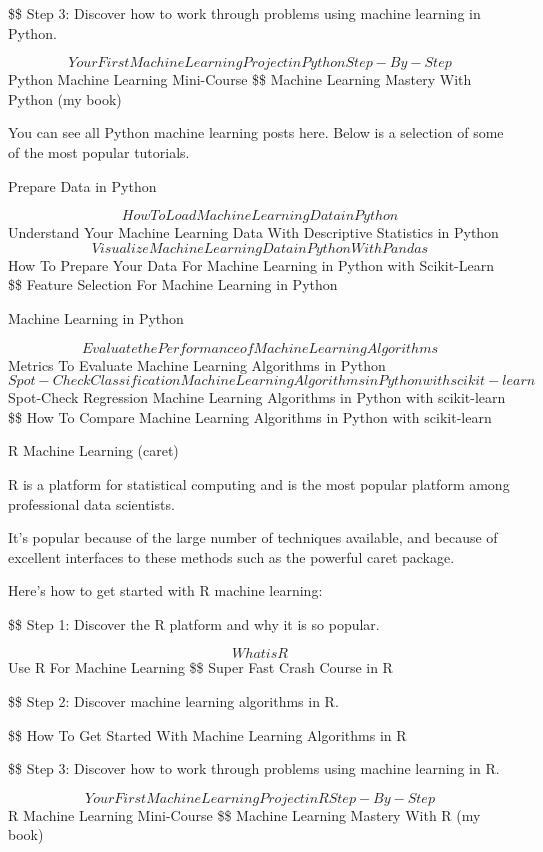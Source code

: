 \documentclass[11pt]{article}
\begin{document}
\$\$ Step 3: Discover how to work through problems using machine learning in Python. 

$$ Your First Machine Learning Project in Python Step-By-Step
 $$ Python Machine Learning Mini-Course
\$\$ Machine Learning Mastery With Python (my book)

You can see all Python machine learning posts here. Below is a selection of some of the most popular tutorials.

Prepare Data in Python

$$ How To Load Machine Learning Data in Python
$$ Understand Your Machine Learning Data With Descriptive Statistics in Python
$$ Visualize Machine Learning Data in Python With Pandas
$$ How To Prepare Your Data For Machine Learning in Python with Scikit-Learn
\$\$ Feature Selection For Machine Learning in Python

Machine Learning in Python

$$ Evaluate the Performance of Machine Learning Algorithms
$$ Metrics To Evaluate Machine Learning Algorithms in Python
$$ Spot-Check Classification Machine Learning Algorithms in Python with scikit-learn
$$ Spot-Check Regression Machine Learning Algorithms in Python with scikit-learn
\$\$ How To Compare Machine Learning Algorithms in Python with scikit-learn

R Machine Learning (caret)

R is a platform for statistical computing and is the most popular platform among professional data scientists.

It’s popular because of the large number of techniques available, and because of excellent interfaces to these methods such as the powerful caret package.

Here’s how to get started with R machine learning:

\$\$ Step 1: Discover the R platform and why it is so popular. 

$$ What is R
 $$ Use R For Machine Learning
\$\$ Super Fast Crash Course in R

\$\$ Step 2: Discover machine learning algorithms in R. 

\$\$ How To Get Started With Machine Learning Algorithms in R

\$\$ Step 3: Discover how to work through problems using machine learning in R. 

$$ Your First Machine Learning Project in R Step-By-Step
 $$ R Machine Learning Mini-Course
\$\$ Machine Learning Mastery With R (my book)
\end{document}
